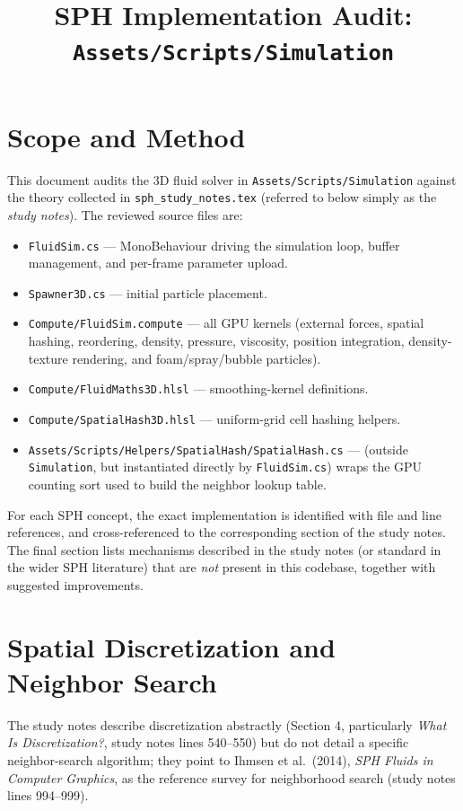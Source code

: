 \documentclass[11pt]{article}
\title{SPH Implementation Audit: \texttt{Assets/Scripts/Simulation}}
\author{}
\date{}
\newcommand{\file}[1]{\texttt{#1}}
\begin{document}
\maketitle
\tableofcontents

\section{Scope and Method}

This document audits the 3D fluid solver in
\texttt{Assets/Scripts/Simulation} against the theory collected in
\texttt{sph\_study\_notes.tex} (referred to below simply as the
\emph{study notes}). The reviewed source files are:

\begin{itemize}
    \item \file{FluidSim.cs} --- MonoBehaviour driving the simulation loop,
    buffer management, and per-frame parameter upload.
    \item \file{Spawner3D.cs} --- initial particle placement.
    \item \file{Compute/FluidSim.compute} --- all GPU kernels (external
    forces, spatial hashing, reordering, density, pressure, viscosity,
    position integration, density-texture rendering, and foam/spray/bubble
    particles).
    \item \file{Compute/FluidMaths3D.hlsl} --- smoothing-kernel
    definitions.
    \item \file{Compute/SpatialHash3D.hlsl} --- uniform-grid cell hashing
    helpers.
    \item \file{Assets/Scripts/Helpers/SpatialHash/SpatialHash.cs} ---
    (outside \texttt{Simulation}, but instantiated directly by
    \file{FluidSim.cs}) wraps the GPU counting sort used to build the
    neighbor lookup table.
\end{itemize}

For each SPH concept, the exact implementation is identified with file and
line references, and cross-referenced to the corresponding section of the
study notes. The final section lists mechanisms described in the study notes
(or standard in the wider SPH literature) that are \emph{not} present in this
codebase, together with suggested improvements.

\section{Spatial Discretization and Neighbor Search}

The study notes describe discretization abstractly (Section 4, particularly
\emph{What Is Discretization?}, study notes lines 540--550) but do not detail
a specific neighbor-search algorithm; they point to Ihmsen et al.\ (2014),
\emph{SPH Fluids in Computer Graphics}, as the reference survey for
neighborhood search (study notes lines 994--999).
\end{document}
